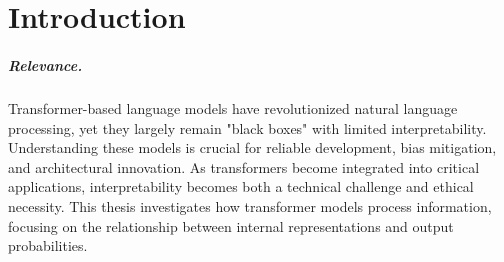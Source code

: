 \chapter{Introduction}



\paragraph{Relevance.}
Transformer-based language models have revolutionized natural language processing, yet they largely remain "black boxes" with limited interpretability. Understanding these models is crucial for reliable development, bias mitigation, and architectural innovation. As transformers become integrated into critical applications, interpretability becomes both a technical challenge and ethical necessity. This thesis investigates how transformer models process information, focusing on the relationship between internal representations and output probabilities.



